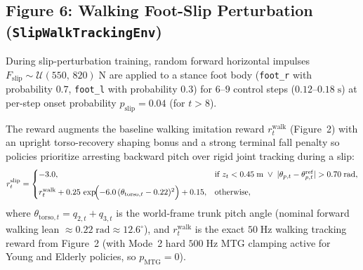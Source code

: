 \subsection*{Figure 6: Walking Foot-Slip Perturbation (\texttt{SlipWalkTrackingEnv})}

During slip-perturbation training, random forward horizontal impulses $F_{\mathrm{slip}} \sim \mathcal{U}(550,\,820)\;\mathrm{N}$ are applied to a stance foot body (\texttt{foot\_r} with probability $0.7$, \texttt{foot\_l} with probability $0.3$) for $6$--$9$ control steps ($0.12$--$0.18\;\mathrm{s}$) at per-step onset probability $p_{\mathrm{slip}} = 0.04$ (for $t > 8$).

The reward augments the baseline walking imitation reward $r_t^{\mathrm{walk}}$ (Figure~2) with an upright torso-recovery shaping bonus and a strong terminal fall penalty so policies prioritize arresting backward pitch over rigid joint tracking during a slip:
\begin{equation}
r_t^{\mathrm{slip}} =
\begin{cases}
-3.0, & \text{if } z_t < 0.45\;\mathrm{m} \;\lor\; |\theta_{p,t} - \theta_{p,t}^{\mathrm{ref}}| > 0.70\;\mathrm{rad}, \\[6pt]
r_t^{\mathrm{walk}} + 0.25\,\exp\!\Bigl(-6.0\,(\theta_{\mathrm{torso},t} - 0.22)^2\Bigr) + 0.15, & \text{otherwise},
\end{cases}
\end{equation}
where $\theta_{\mathrm{torso},t} = q_{2,t} + q_{3,t}$ is the world-frame trunk pitch angle (nominal forward walking lean $\approx 0.22\;\mathrm{rad} \approx 12.6^\circ$), and $r_t^{\mathrm{walk}}$ is the exact $50\;\mathrm{Hz}$ walking tracking reward from Figure~2 (with Mode~2 hard $500\;\mathrm{Hz}$ MTG clamping active for Young and Elderly policies, so $p_{\mathrm{MTG}} = 0$).
